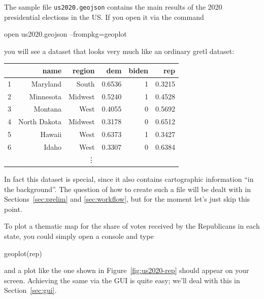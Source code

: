 \documentclass{article}
\begin{document}
The sample file \texttt{us2020.geojson} contains the main results of
the 2020 presidential elections in the US. If you open it via the
command
\begin{code}
  open us2020.geojson --frompkg=geoplot
\end{code}
you will see a dataset that looks very much like an ordinary gretl
dataset:
\begin{center}
\begin{tabular}{rrrrrr}
\hline
   &          name &   region &         dem &    biden &      rep  \\ 
\hline                                                   
 1 &      Maryland &    South &      0.6536 &        1 &   0.3215  \\ 
 2 &     Minnesota &  Midwest &      0.5240 &        1 &   0.4528  \\ 
 3 &       Montana &     West &      0.4055 &        0 &   0.5692  \\ 
 4 &  North Dakota &  Midwest &      0.3178 &        0 &   0.6512  \\ 
 5 &        Hawaii &     West &      0.6373 &        1 &   0.3427  \\ 
 6 &         Idaho &     West &      0.3307 &        0 &   0.6384  \\ 
\multicolumn{6}{c}{\vdots} \\  
\hline
\end{tabular}
\end{center}

In fact this dataset is special, since it also contains cartographic
information ``in the background''. The question of how to create such
a file will be dealt with in Sections~\ref{sec:prelim} and
\ref{sec:workflow}, but for the moment let's just skip this point.

To plot a thematic map for the share of votes received by the
Republicans in each state, you could simply open a console and type
\begin{code}
geoplot(rep)
\end{code}
and a plot like the one shown in Figure~\ref{fig:us2020-rep}
should appear on your screen. Achieving the same via the GUI is quite
easy; we'll deal with this in Section~\ref{sec:gui}.
\end{document}
